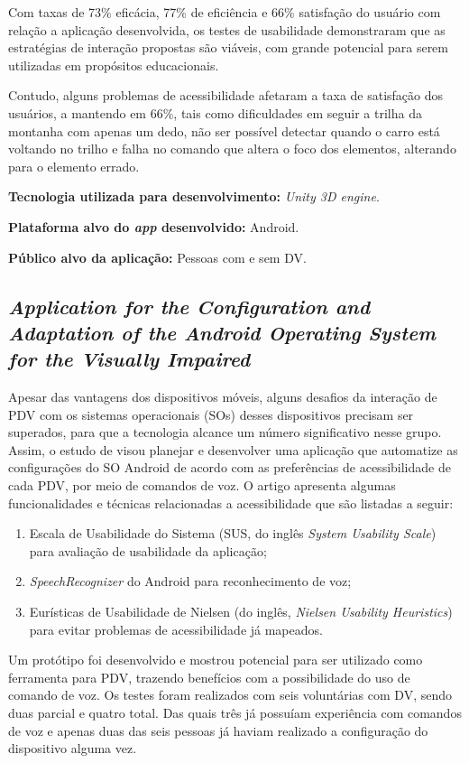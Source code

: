 Com taxas de 73\% eficácia, 77\% de eficiência e 66\% satisfação do usuário com relação a aplicação desenvolvida, os testes de usabilidade
demonstraram que as estratégias de interação propostas são viáveis, com grande potencial para serem utilizadas em propósitos educacionais.

Contudo, alguns problemas de acessibilidade afetaram a taxa de satisfação dos usuários, a mantendo em 66\%, tais como
dificuldades em seguir a trilha da montanha com apenas um dedo, não ser possível detectar quando o carro está voltando
no trilho e falha no comando que altera o foco dos elementos, alterando para o elemento errado.

\textbf{Tecnologia utilizada para desenvolvimento:} \emph{Unity 3D engine}.

\textbf{Plataforma alvo do \emph{app} desenvolvido:} Android.

\textbf{Público alvo da aplicação:} Pessoas com e sem DV\@.

\subsection{\emph{Application for the Configuration and Adaptation of the Android Operating System for the Visually Impaired}}

Apesar das vantagens dos dispositivos móveis, alguns desafios da interação de PDV com os sistemas operacionais (SOs) desses dispositivos precisam ser superados, para que a tecnologia alcance
um número significativo nesse grupo. Assim, o estudo de  visou planejar e desenvolver uma aplicação que automatize as configurações do SO Android de acordo com
as preferências de acessibilidade de cada PDV, por meio de comandos de voz. O artigo apresenta algumas funcionalidades e técnicas relacionadas a acessibilidade que são listadas a seguir:

\begin{enumerate}
    \item Escala de Usabilidade do Sistema (SUS, do inglês \emph{System Usability Scale}) para avaliação de usabilidade da aplicação;
    \item \emph{SpeechRecognizer} do Android para reconhecimento de voz;
    \item Eurísticas de Usabilidade de Nielsen (do inglês, \emph{Nielsen Usability Heuristics}) para evitar problemas de acessibilidade já mapeados.
\end{enumerate}

Um protótipo foi desenvolvido e mostrou potencial para ser utilizado como ferramenta para PDV, trazendo benefícios com a possibilidade do uso de comando de voz.
Os testes foram realizados com seis voluntárias com DV, sendo duas parcial e quatro total.
Das quais três já possuíam experiência com comandos de voz e apenas duas das seis pessoas já haviam realizado a configuração do dispositivo alguma vez.

